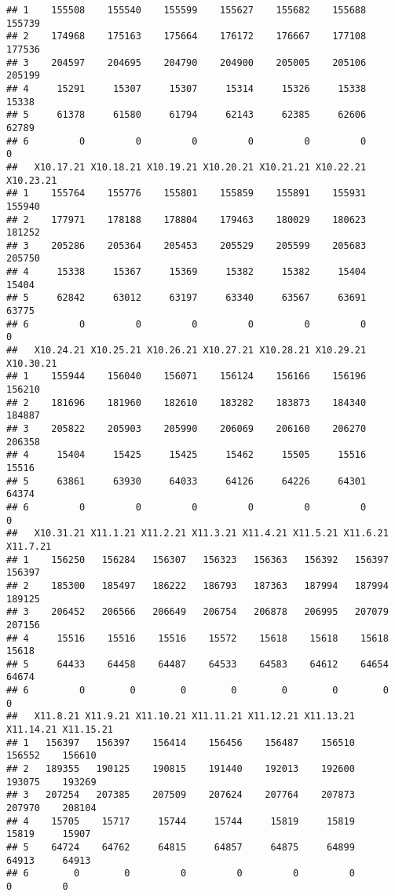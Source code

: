 \documentclass[
]{article}
\begin{document}
\begin{verbatim}
## 1    155508    155540    155599    155627    155682    155688    155739
## 2    174968    175163    175664    176172    176667    177108    177536
## 3    204597    204695    204790    204900    205005    205106    205199
## 4     15291     15307     15307     15314     15326     15338     15338
## 5     61378     61580     61794     62143     62385     62606     62789
## 6         0         0         0         0         0         0         0
##   X10.17.21 X10.18.21 X10.19.21 X10.20.21 X10.21.21 X10.22.21 X10.23.21
## 1    155764    155776    155801    155859    155891    155931    155940
## 2    177971    178188    178804    179463    180029    180623    181252
## 3    205286    205364    205453    205529    205599    205683    205750
## 4     15338     15367     15369     15382     15382     15404     15404
## 5     62842     63012     63197     63340     63567     63691     63775
## 6         0         0         0         0         0         0         0
##   X10.24.21 X10.25.21 X10.26.21 X10.27.21 X10.28.21 X10.29.21 X10.30.21
## 1    155944    156040    156071    156124    156166    156196    156210
## 2    181696    181960    182610    183282    183873    184340    184887
## 3    205822    205903    205990    206069    206160    206270    206358
## 4     15404     15425     15425     15462     15505     15516     15516
## 5     63861     63930     64033     64126     64226     64301     64374
## 6         0         0         0         0         0         0         0
##   X10.31.21 X11.1.21 X11.2.21 X11.3.21 X11.4.21 X11.5.21 X11.6.21 X11.7.21
## 1    156250   156284   156307   156323   156363   156392   156397   156397
## 2    185300   185497   186222   186793   187363   187994   187994   189125
## 3    206452   206566   206649   206754   206878   206995   207079   207156
## 4     15516    15516    15516    15572    15618    15618    15618    15618
## 5     64433    64458    64487    64533    64583    64612    64654    64674
## 6         0        0        0        0        0        0        0        0
##   X11.8.21 X11.9.21 X11.10.21 X11.11.21 X11.12.21 X11.13.21 X11.14.21 X11.15.21
## 1   156397   156397    156414    156456    156487    156510    156552    156610
## 2   189355   190125    190815    191440    192013    192600    193075    193269
## 3   207254   207385    207509    207624    207764    207873    207970    208104
## 4    15705    15717     15744     15744     15819     15819     15819     15907
## 5    64724    64762     64815     64857     64875     64899     64913     64913
## 6        0        0         0         0         0         0         0         0

\end{verbatim}
\end{document}
